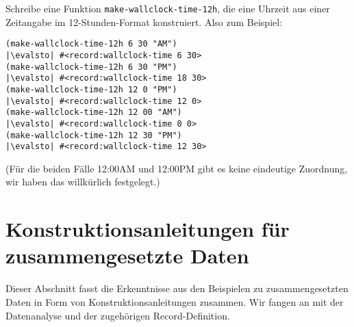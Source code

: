 \begin{aufgabeinline}
  Schreibe eine Funktion \lstinline{make-wallclock-time-12h}, die eine
  Uhrzeit aus einer Zeitangabe im 12-Stunden-Format konstruiert.  Also
  zum Beispiel:
\begin{lstlisting}
(make-wallclock-time-12h 6 30 "AM")
|\evalsto| #<record:wallclock-time 6 30>
(make-wallclock-time-12h 6 30 "PM")
|\evalsto| #<record:wallclock-time 18 30>
(make-wallclock-time-12h 12 0 "PM")
|\evalsto| #<record:wallclock-time 12 0>
(make-wallclock-time-12h 12 00 "AM")
|\evalsto| #<record:wallclock-time 0 0>
(make-wallclock-time-12h 12 30 "PM")
|\evalsto| #<record:wallclock-time 12 30>
\end{lstlisting}
  (Für die beiden Fälle 12:00AM und 12:00PM gibt es keine eindeutige
  Zuordnung, wir haben das willkürlich festgelegt.)
\end{aufgabeinline}

\section{Konstruktionsanleitungen für zusammengesetzte Daten}

Dieser Abschnitt fasst die Erkenntnisse aus den Beispielen
zu zusammengesetzten Daten in Form von Konstruktionsanleitungen
zusammen.  Wir fangen an mit der Datenanalyse und der zugehörigen
Record-Definition.

